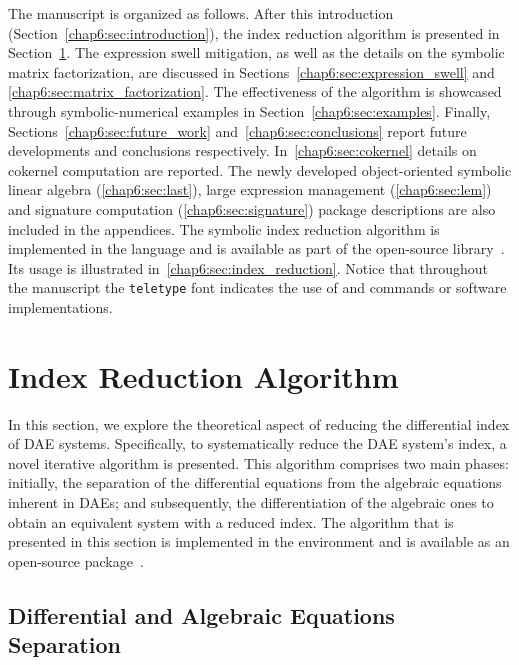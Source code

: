 The manuscript is organized as follows. After this introduction (Section~\ref{chap6:sec:introduction}), the index reduction algorithm is presented in Section~\ref{chap6:sec:algorithm}. The expression swell mitigation, as well as the details on the symbolic matrix factorization, are discussed in Sections~\ref{chap6:sec:expression_swell} and \ref{chap6:sec:matrix_factorization}. The effectiveness of the algorithm is showcased through symbolic-numerical examples in Section~\ref{chap6:sec:examples}. Finally, Sections~\ref{chap6:sec:future_work} and~\ref{chap6:sec:conclusions} report future developments and conclusions respectively. In~\ref{chap6:sec:cokernel} details on cokernel computation are reported. The newly developed object-oriented symbolic linear algebra (\ref{chap6:sec:last}), large expression management (\ref{chap6:sec:lem}) and signature computation (\ref{chap6:sec:signature}) package descriptions are also included in the appendices. The symbolic index reduction algorithm is implemented in the \Maple{} language and is available as part of the open-source \Indigo{} library~\cite{indigo}. Its usage is illustrated in~\ref{chap6:sec:index_reduction}. Notice that throughout the manuscript the \texttt{teletype} font indicates the use of \Maple{} and \Matlab{} commands or software implementations.


\section{Index Reduction Algorithm}
\label{chap6:sec:algorithm}

In this section, we explore the theoretical aspect of reducing the differential index of \ac{DAE} systems. Specifically, to systematically reduce the \ac{DAE} system's index, a novel iterative algorithm is presented. This algorithm comprises two main phases: initially, the separation of the differential equations from the algebraic equations inherent in \acp{DAE}; and subsequently, the differentiation of the algebraic ones to obtain an equivalent system with a reduced index. The algorithm that is presented in this section is implemented in the \Maple{} environment and is available as an open-source package~\cite{indigo}.

\subsection{Differential and Algebraic Equations Separation}
\label{chap6:sec:separation}

